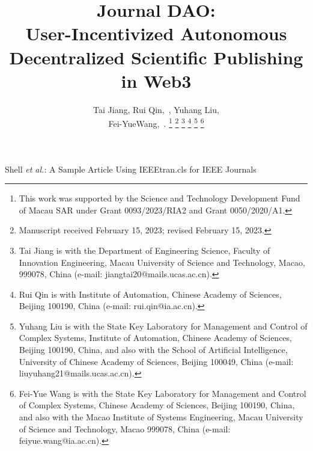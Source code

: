 \documentclass[lettersize,journal]{IEEEtran}
\begin{document}
\title{Journal DAO: \\ User-Incentivized Autonomous Decentralized Scientific Publishing in Web3}

\author{Tai Jiang, Rui Qin,~, Yuhang Liu, \\
  Fei-YueWang,~.
  \thanks{This work was supported by the Science and Technology Development Fund of Macau SAR under Grant 0093/2023/RIA2 and  Grant 0050/2020/A1.}%
  \thanks{Manuscript received February 15, 2023; revised February 15, 2023.}
  \thanks{Tai Jiang is with the Department of Engineering Science, Faculty of Innovation Engineering, Macau University of Science and Technology, Macao, 999078, China (e-mail: jiangtai20@mails.ucas.ac.cn).}
  \thanks{Rui Qin is with Institute of Automation, Chinese Academy of Sciences, Beijing 100190, China (e-mail: rui.qin@ia.ac.cn).}
  \thanks{Yuhang Liu is with the State Key Laboratory for Management and Control of Complex Systems, Institute of Automation, Chinese Academy of Sciences, Beijing 100190, China, and also with the School of Artificial Intelligence, University of Chinese Academy of Sciences, Beijing 100049, China (e-mail: liuyuhang21@mails.ucas.ac.cn).}
  \thanks{Fei-Yue Wang is with the State Key Laboratory for Management and Control of Complex Systems, Chinese Academy of Sciences, Beijing 100190, China, and also with the Macao Institute of Systems Engineering, Macau University of Science and Technology, Macao 999078, China (e-mail: feiyue.wang@ia.ac.cn).}

}

%
{Shell \MakeLowercase{\textit{et al.}}: A Sample Article Using IEEEtran.cls for IEEE Journals}


\maketitle
\end{document}
